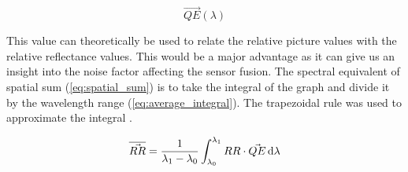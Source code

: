 \begin{equation}
    \label{eq:quantum_efficiency}
    \vec{QE}(\lambda)    
\end{equation}

This value can theoretically be used to relate the relative picture values with the relative reflectance values. This would be a major advantage as it can give us an insight into the noise factor affecting the sensor fusion.  
The spectral equivalent of spatial sum (\ref{eq:spatial_sum}) is to take the integral of the graph and divide it by the wavelength range (\ref{eq:average_integral}). The trapezoidal rule was used to approximate the integral \cite{TrapezoidRuleMathematical}. 

\begin{equation}
    \label{eq:average_integral}
    \overline{\vec{RR}} = \frac{1}{\lambda_1 - \lambda_0} \int_{\lambda_0}^{\lambda_1} RR \cdot \vec{QE} \,\mathrm{d}\lambda 
\end{equation}